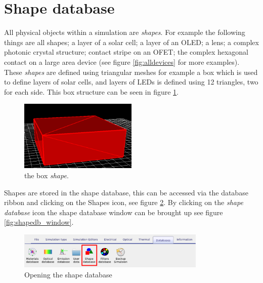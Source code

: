 \newpage
\section{Shape database}
\label{sec:shapedatabase}
All physical objects within a simulation are \emph{shapes}. For example the following things are all shapes; a layer of a solar cell; a layer of an OLED; a lens; a complex photonic crystal structure; contact stripe on an OFET; the complex hexagonal contact on a large area device (see figure \ref{fig:alldevices} for more examples). These \emph{shapes} are defined using triangular meshes for example a box which is used to define layers of solar cells, and layers of LEDs is defined using 12 triangles, two for each side.  This box structure can be seen in figure \ref{fig:shape_box}.

\begin{figure}[H]
\centering
\includegraphics[width=0.5\textwidth]{./images/database_shapes/box.png}
\caption{the box \emph{shape}.}
\label{fig:shape_box}
\end{figure}

Shapes are stored in the shape database, this can be accessed via the database ribbon and clicking on the Shapes icon, see figure \ref{fig:shapedb}. By clicking on the \emph{shape database} icon the shape database window can be brought up see figure \ref{fig:shapedb_window}.

\begin{figure}[H]
\centering
\includegraphics[width=0.8\textwidth]{./images/database_shapes/database_shapes.png}
\caption{Opening the shape database}
\label{fig:shapedb}
\end{figure}


